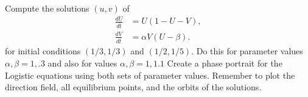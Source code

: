 \begin{problem}
	Compute the solutions $(u,v)$ of 
	\begin{align*}
		\frac{dU}{d\bar{t}} &= U(1-U-V),\\
		\frac{dV}{d\bar{t}} &= \alpha V (U-\beta).
	\end{align*}
	for initial conditions $(1/3, 1/3)$ and $(1/2, 1/5)$. Do this for parameter 
	values $\alpha, \beta = 1, .3$ and also for values $\alpha, \beta = 1, 1.1$
	Create a phase portrait for the Logistic equations using both sets of parameter
	values. Remember to plot the direction field, all equilibrium points, and the orbits
	of the solutions.
\end{problem}
















